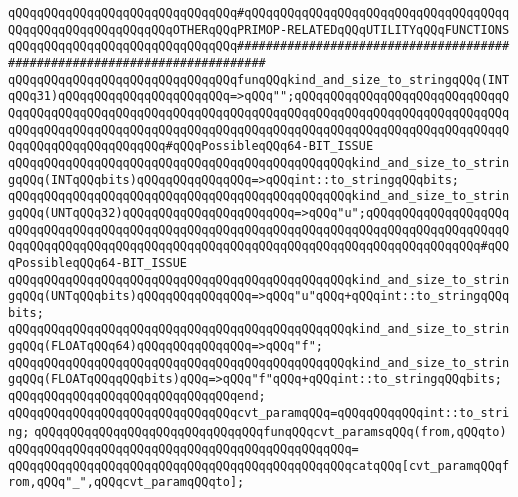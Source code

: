 \verb|qQQqqQQqqQQqqQQqqQQqqQQqqQQqqQQq#qQQqqQQqqQQqqQQqqQQqqQQqqQQqqQQqqQQqqQQqqQQqqQQqqQQqqQQqqQQqOTHERqQQqPRIMOP-RELATEDqQQqUTILITYqQQqFUNCTIONS|\newline
\verb|qQQqqQQqqQQqqQQqqQQqqQQqqQQqqQQq##########################################################################|\newline
\newline
\verb|qQQqqQQqqQQqqQQqqQQqqQQqqQQqqQQqfunqQQqkind_and_size_to_stringqQQq(INTqQQq31)qQQqqQQqqQQqqQQqqQQqqQQq=>qQQq"";qQQqqQQqqQQqqQQqqQQqqQQqqQQqqQQqqQQqqQQqqQQqqQQqqQQqqQQqqQQqqQQqqQQqqQQqqQQqqQQqqQQqqQQqqQQqqQQqqQQqqQQqqQQqqQQqqQQqqQQqqQQqqQQqqQQqqQQqqQQqqQQqqQQqqQQqqQQqqQQqqQQqqQQqqQQqqQQqqQQqqQQqqQQqqQQq#qQQqPossibleqQQq64-BIT_ISSUE|\newline
\verb|qQQqqQQqqQQqqQQqqQQqqQQqqQQqqQQqqQQqqQQqqQQqqQQqkind_and_size_to_stringqQQq(INTqQQqbits)qQQqqQQqqQQqqQQq=>qQQqint::to_stringqQQqbits;|\newline
\verb|qQQqqQQqqQQqqQQqqQQqqQQqqQQqqQQqqQQqqQQqqQQqqQQqkind_and_size_to_stringqQQq(UNTqQQq32)qQQqqQQqqQQqqQQqqQQqqQQq=>qQQq"u";qQQqqQQqqQQqqQQqqQQqqQQqqQQqqQQqqQQqqQQqqQQqqQQqqQQqqQQqqQQqqQQqqQQqqQQqqQQqqQQqqQQqqQQqqQQqqQQqqQQqqQQqqQQqqQQqqQQqqQQqqQQqqQQqqQQqqQQqqQQqqQQqqQQqqQQqqQQq#qQQqPossibleqQQq64-BIT_ISSUE|\newline
\verb|qQQqqQQqqQQqqQQqqQQqqQQqqQQqqQQqqQQqqQQqqQQqqQQqkind_and_size_to_stringqQQq(UNTqQQqbits)qQQqqQQqqQQqqQQq=>qQQq"u"qQQq+qQQqint::to_stringqQQqbits;|\newline
\verb|qQQqqQQqqQQqqQQqqQQqqQQqqQQqqQQqqQQqqQQqqQQqqQQqkind_and_size_to_stringqQQq(FLOATqQQq64)qQQqqQQqqQQqqQQq=>qQQq"f";|\newline
\verb|qQQqqQQqqQQqqQQqqQQqqQQqqQQqqQQqqQQqqQQqqQQqqQQqkind_and_size_to_stringqQQq(FLOATqQQqqQQqbits)qQQq=>qQQq"f"qQQq+qQQqint::to_stringqQQqbits;|\newline
\verb|qQQqqQQqqQQqqQQqqQQqqQQqqQQqqQQqend;|\newline
\newline
\newline
\verb|qQQqqQQqqQQqqQQqqQQqqQQqqQQqqQQqcvt_paramqQQq=qQQqqQQqqQQqint::to_string;|\newline
\newline
\verb|qQQqqQQqqQQqqQQqqQQqqQQqqQQqqQQqfunqQQqcvt_paramsqQQq(from,qQQqto)|\newline
\verb|qQQqqQQqqQQqqQQqqQQqqQQqqQQqqQQqqQQqqQQqqQQqqQQq=|\newline
\verb|qQQqqQQqqQQqqQQqqQQqqQQqqQQqqQQqqQQqqQQqqQQqqQQqcatqQQq[cvt_paramqQQqfrom,qQQq"_",qQQqcvt_paramqQQqto];|\newline
